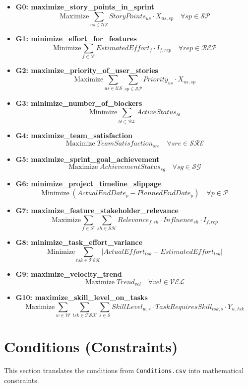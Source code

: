 \documentclass[11pt, a4paper]{article}
\begin{document}
\begin{itemize}
    \item \textbf{G0: maximize\_story\_points\_in\_sprint}
    $$ \text{Maximize} \sum_{us \in \mathcal{US}} StoryPoints_{us} \cdot X_{us,sp} \quad \forall sp \in \mathcal{SP} $$
    \item \textbf{G1: minimize\_effort\_for\_features}
    $$ \text{Minimize} \sum_{f \in \mathcal{F}} EstimatedEffort_{f} \cdot I_{f,rep} \quad \forall rep \in \mathcal{REP} $$
    \item \textbf{G2: maximize\_priority\_of\_user\_stories}
    $$ \text{Maximize} \sum_{us \in \mathcal{US}} \sum_{sp \in \mathcal{SP}} Priority_{us} \cdot X_{us,sp} $$
    \item \textbf{G3: minimize\_number\_of\_blockers}
    $$ \text{Minimize} \sum_{bl \in \mathcal{BL}} ActiveStatus_{bl} $$
    \item \textbf{G4: maximize\_team\_satisfaction}
    $$ \text{Maximize} \; TeamSatisfaction_{sre} \quad \forall sre \in \mathcal{SRE} $$
    \item \textbf{G5: maximize\_sprint\_goal\_achievement}
    $$ \text{Maximize} \; AchievementStatus_{sg} \quad \forall sg \in \mathcal{SG} $$
    \item \textbf{G6: minimize\_project\_timeline\_slippage}
    $$ \text{Minimize} \; (ActualEndDate_{p} - PlannedEndDate_{p}) \quad \forall p \in \mathcal{P} $$
    \item \textbf{G7: maximize\_feature\_stakeholder\_relevance}
    $$ \text{Maximize} \sum_{f \in \mathcal{F}} \sum_{sh \in \mathcal{SH}} Relevance_{f,sh} \cdot Influence_{sh} \cdot I_{f,rep} $$
    \item \textbf{G8: minimize\_task\_effort\_variance}
    $$ \text{Minimize} \sum_{tsk \in \mathcal{TSK}} |ActualEffort_{tsk} - EstimatedEffort_{tsk}| $$
    \item \textbf{G9: maximize\_velocity\_trend}
    $$ \text{Maximize} \; Trend_{vel} \quad \forall vel \in \mathcal{VEL} $$
    \item \textbf{G10: maximize\_skill\_level\_on\_tasks}
    $$ \text{Maximize} \sum_{w \in \mathcal{W}} \sum_{tsk \in \mathcal{TSK}} \sum_{s \in \mathcal{S}} SkillLevel_{w,s} \cdot TaskRequiresSkill_{tsk,s} \cdot Y_{w,tsk} $$
\end{itemize}

\section{Conditions (Constraints)}
This section translates the conditions from \texttt{Conditions.csv} into mathematical constraints.
\end{document}
